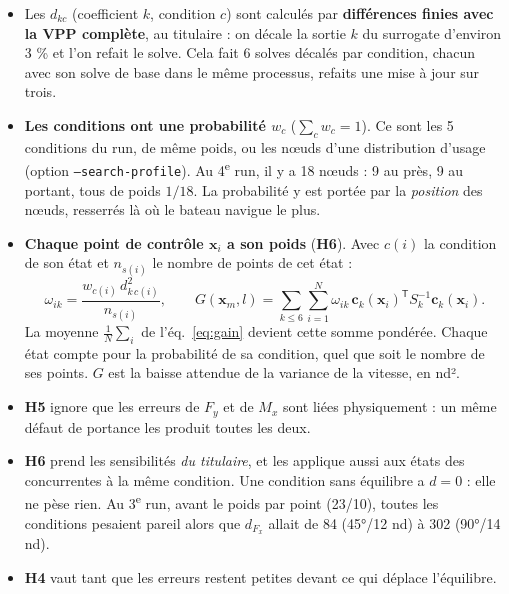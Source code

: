 \documentclass[11pt,a4paper]{article}
\newcommand{\vx}{\bm{x}}
\newcommand{\vc}{\bm{c}}
\newcommand{\tp}{^{\mathsf{T}}}
\newcommand{\py}[1]{\texttt{#1}}
\begin{document}
\begin{danslecode}
\begin{itemize}
  \item Les $d_{kc}$ (coefficient $k$, condition $c$) sont calculés par \textbf{différences finies avec la
        VPP complète}, au titulaire : on décale la sortie $k$ du surrogate d'environ 3 \% et l'on refait le
        solve. Cela fait 6 solves décalés par condition, chacun avec son solve de base dans le même
        processus, refaits une mise à jour sur trois.
  \item \textbf{Les conditions ont une probabilité $w_c$} ($\sum_c w_c=1$). Ce sont les 5 conditions du run,
        de même poids, ou les nœuds d'une distribution d'usage (option \py{--search-profile}). Au
        4\textsuperscript{e} run, il y a 18 nœuds : 9 au près, 9 au portant, tous de poids $1/18$. La
        probabilité y est portée par la \emph{position} des nœuds, resserrés là où le bateau navigue le plus.
  \item \textbf{Chaque point de contrôle $\vx_i$ a son poids} (\textbf{H6}). Avec $c(i)$ la condition de son
        état et $n_{s(i)}$ le nombre de points de cet état :
        \begin{equation}\label{eq:poids}
          \omega_{ik}=\frac{w_{c(i)}\,d_{k\,c(i)}^2}{n_{s(i)}},\qquad
          G(\vx_m,l)=\sum_{k\le6}\sum_{i=1}^{N}\omega_{ik}\,\vc_k(\vx_i)\tp S_k^{-1}\vc_k(\vx_i).
        \end{equation}
        La moyenne $\frac1N\sum_i$ de l'éq.~\eqref{eq:gain} devient cette somme pondérée. Chaque état compte
        pour la probabilité de sa condition, quel que soit le nombre de ses points. $G$ est la baisse
        attendue de la variance de la vitesse, en nd².
\end{itemize}
\end{danslecode}

\begin{subtilite}
\begin{itemize}
  \item \textbf{H5} ignore que les erreurs de $F_y$ et de $M_x$ sont liées physiquement : un même défaut de
        portance les produit toutes les deux.
  \item \textbf{H6} prend les sensibilités \emph{du titulaire}, et les applique aussi aux états des
        concurrentes à la même condition. Une condition sans équilibre a $d=0$ : elle ne pèse rien. Au
        3\textsuperscript{e} run, avant le poids par point (23/10), toutes les conditions pesaient pareil alors
        que $d_{F_x}$ allait de 84 (45°/12 nd) à 302 (90°/14 nd).
  \item \textbf{H4} vaut tant que les erreurs restent petites devant ce qui déplace l'équilibre.
\end{itemize}
\end{subtilite}
\end{document}
